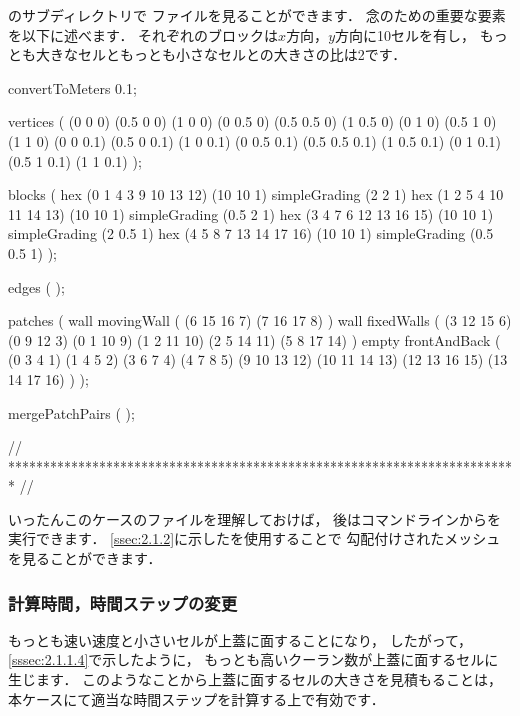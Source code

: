 のサブディレクトリで
ファイルを見ることができます．
念のための重要な要素を以下に述べます．
それぞれのブロックは$x$方向，$y$方向に10セルを有し，
もっとも大きなセルともっとも小さなセルとの大きさの比は2です．
\begin{OFverbatim}[file, linenum=17]
convertToMeters 0.1;

vertices
(
    (0 0 0)
    (0.5 0 0)
    (1 0 0)
    (0 0.5 0)
    (0.5 0.5 0)
    (1 0.5 0)
    (0 1 0)
    (0.5 1 0)
    (1 1 0)
    (0 0 0.1)
    (0.5 0 0.1)
    (1 0 0.1)
    (0 0.5 0.1)
    (0.5 0.5 0.1)
    (1 0.5 0.1)
    (0 1 0.1)
    (0.5 1 0.1)
    (1 1 0.1)
);

blocks
(
    hex (0 1 4 3 9 10 13 12) (10 10 1) simpleGrading (2 2 1)
    hex (1 2 5 4 10 11 14 13) (10 10 1) simpleGrading (0.5 2 1)
    hex (3 4 7 6 12 13 16 15) (10 10 1) simpleGrading (2 0.5 1)
    hex (4 5 8 7 13 14 17 16) (10 10 1) simpleGrading (0.5 0.5 1)
);

edges
(
);

patches
(
    wall movingWall
    (
        (6 15 16 7)
        (7 16 17 8)
    )
    wall fixedWalls
    (
        (3 12 15 6)
        (0 9 12 3)
        (0 1 10 9)
        (1 2 11 10)
        (2 5 14 11)
        (5 8 17 14)
    )
    empty frontAndBack
    (
        (0 3 4 1)
        (1 4 5 2)
        (3 6 7 4)
        (4 7 8 5)
        (9 10 13 12)
        (10 11 14 13)
        (12 13 16 15)
        (13 14 17 16)
    )
);

mergePatchPairs
(
);

// ************************************************************************* //
\end{OFverbatim}
いったんこのケースのファイルを理解しておけば，
後はコマンドラインからを実行できます．
\autoref{ssec:2.1.2}に示したを使用することで
勾配付けされたメッシュを見ることができます．

\subsubsection{計算時間，時間ステップの変更}
\label{sssec:2.1.6.2}
もっとも速い速度と小さいセルが上蓋に面することになり，
したがって，\autoref{sssec:2.1.1.4}で示したように，
もっとも高いクーラン数が上蓋に面するセルに生じます．
このようなことから上蓋に面するセルの大きさを見積もることは，
本ケースにて適当な時間ステップを計算する上で有効です．

